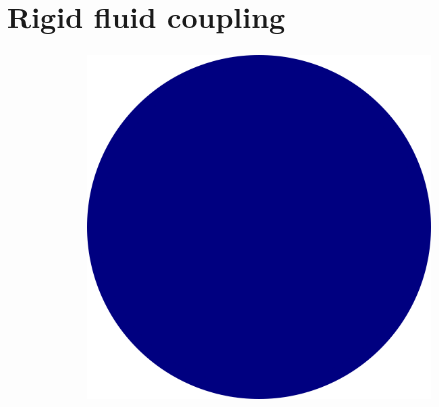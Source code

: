 \documentclass[preprint,12pt]{elsarticle}
\begin{document}
\FloatBarrier%
\section{Rigid fluid coupling}
\label{sec:rfc}


\begin{figure}[!htpb]
  \centering
  \begin{subfigure}{0.22\textwidth}
    \centering
    \includegraphics[width=1.0\textwidth]{images/rfc_explantion_schematic/real_spherical_particles}
  \end{subfigure}\hspace{15mm}%
  \begin{subfigure}{0.24\textwidth}
    \centering

\end{subfigure}
\end{figure}
\end{document}
